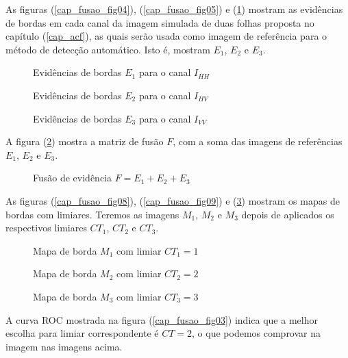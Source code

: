As figuras (\ref{cap_fusao_fig04}), (\ref{cap_fusao_fig05}) e (\ref{cap_fusao_fig06}) mostram as evidências de bordas em cada canal da imagem simulada de duas folhas proposta no capítulo (\ref{cap_acf}), as quais serão usada como imagem de referência para o método de detecção automático. Isto é, mostram $E_1$, $E_2$ e $E_3$.
\begin{figure}[!hbt]
\caption{Evidências de bordas $E_1$ para o canal $I_{HH}$}\label{cap_fusao_fig04}
\endminipage\hfill
{}
\caption{Evidências de bordas $E_2$ para o canal $I_{HV}$}\label{cap_fusao_fig05}
\endminipage\hfill
\centering
{}
\caption{Evidências de bordas $E_3$ para o canal $I_{VV}$}\label{cap_fusao_fig06}
\endminipage\hfill
\end{figure}


A figura (\ref{cap_fusao_fig07}) mostra a matriz de fusão $F$, com a soma das imagens de referências $E_1$, $E_2$ e $E_3$.

\begin{figure}[!hbt]
\caption{Fusão de evidência $F = E_1+E_2+E_3$}\label{cap_fusao_fig07}
\end{figure}

As figuras (\ref{cap_fusao_fig08}), (\ref{cap_fusao_fig09}) e (\ref{cap_fusao_fig10}) mostram os mapas de bordas com limiares. Teremos as imagens $M_1$, $M_2$ e $M_3$ depois de aplicados os respectivos limiares $CT_1$, $CT_2$ e $CT_3$.

\begin{figure}[!hbt]
\caption{Mapa de borda $M_1$ com limiar $CT_1=1$}\label{cap_fusao_fig08}
\endminipage\hfill
{}
\caption{Mapa de borda $M_2$ com limiar $CT_2=2$}\label{cap_fusao_fig09}
\endminipage\hfill
\centering
{}
\caption{Mapa de borda $M_3$ com limiar $CT_3=3$}\label{cap_fusao_fig10}
\endminipage\hfill
\end{figure}

A curva ROC mostrada na figura (\ref{cap_fusao_fig03}) indica que a melhor escolha para limiar correspondente é $CT=2$, o que podemos comprovar na imagem nas imagens acima.  
